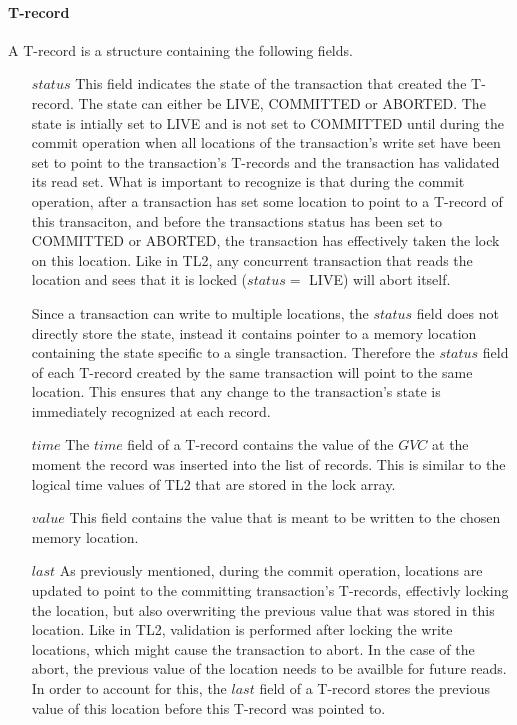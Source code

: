 \documentclass[11pt,letterpaper]{article}
\begin{document}
\paragraph{T-record}
A T-record is a structure containing the following fields.
\begin{itemize}
\vspace{-0.1cm}
\item[$\mathit{status}$]
This  field  indicates  the  state  of the  transaction  that  created  the
T-record. The  
state can either be LIVE, COMMITTED or ABORTED.
The state is intially set to LIVE and is not set to COMMITTED until during the commit operation when 
all locations of the transaction's write set have been set to point to the transaction's T-records
and the transaction has validated its read set.
What is important to recognize is that during the commit operation, after a transaction has set some location to point to a T-record
of this transaciton, and before the transactions status has been set to COMMITTED or ABORTED, the transaction has effectively
taken the lock on this location.
Like in TL2, any concurrent transaction that reads the location and sees that it is locked ($\mathit{status} = $ LIVE) will
abort itself.

Since a transaction can write to multiple locations, the $\mathit{status}$ field
does not directly store the state, instead it contains
pointer to a memory location containing the state specific to a single transaction.
Therefore the $\mathit{status}$ field of each T-record created by the same transaction will point to the same location.
This ensures that any change to the transaction's state is immediately recognized at each record.
\vspace{-0.2cm}
\item[$\mathit{time}$]
The  $\mathit{time}$  field of  a T-record  contains the  
value of  the $\mathit{GVC}$  at  the  moment the  record  was 
inserted  into the  list of   records.
This is similar to the logical time values of TL2 that are stored in the lock array.
\vspace{-0.2cm}
\item[$\mathit{value}$]
This field contains the value that is meant to be written to the chosen 
memory location.
\vspace{-0.2cm}
\item[$\mathit{last}$]
As previously mentioned, during the commit operation, locations are updated to point
to the committing transaction's T-records, effectivly locking the location, but also overwriting the previous value
that was stored in this location.
Like in TL2, validation is performed after locking the write locations, which might cause the transaction to abort.
In the case of the abort, the previous value of the location needs to be availble for future reads.
In order to account for this, the $\mathit{last}$ field of a T-record
stores the previous value of this location before this T-record was pointed to.

\end{itemize}
\end{document}
